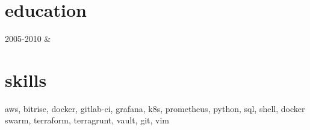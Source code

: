 \documentclass[changecolor={47, 79, 79}]{cv-roald}
\begin{document}
\section*{education}
\begin{tabularcv}
2005-2010   &   

\end{tabularcv}

\section*{skills}
aws, bitrise, docker, gitlab-ci, grafana, k8s, prometheus, python, sql, shell, docker swarm, terraform, terragrunt, vault, git, vim
    
\end{document}
